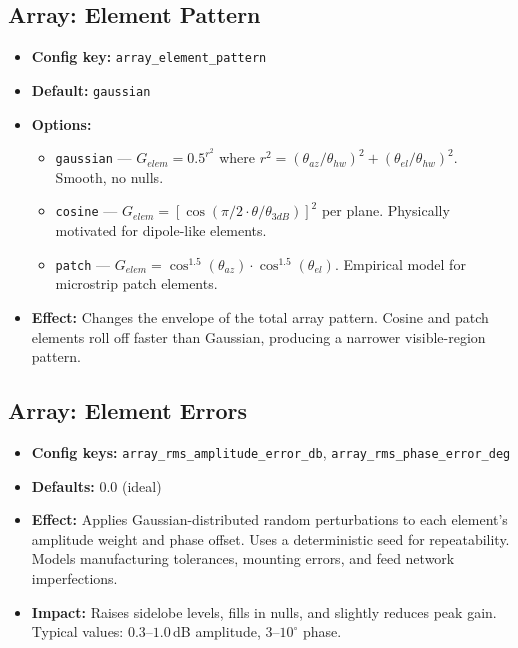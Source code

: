\documentclass[11pt,a4paper]{article}
\begin{document}
\subsection{Array: Element Pattern}
\begin{itemize}
    \item \textbf{Config key:} \texttt{array\_element\_pattern}
    \item \textbf{Default:} \texttt{gaussian}
    \item \textbf{Options:}
    \begin{itemize}
        \item \texttt{gaussian} --- $G_{elem} = 0.5^{r^2}$ where $r^2 = (\theta_{az}/\theta_{hw})^2 + (\theta_{el}/\theta_{hw})^2$. Smooth, no nulls.
        \item \texttt{cosine} --- $G_{elem} = [\cos(\pi/2 \cdot \theta/\theta_{3dB})]^2$ per plane. Physically motivated for dipole-like elements.
        \item \texttt{patch} --- $G_{elem} = \cos^{1.5}(\theta_{az}) \cdot \cos^{1.5}(\theta_{el})$. Empirical model for microstrip patch elements.
    \end{itemize}
    \item \textbf{Effect:} Changes the envelope of the total array pattern. Cosine and patch elements roll off faster than Gaussian, producing a narrower visible-region pattern.
\end{itemize}

\subsection{Array: Element Errors}
\begin{itemize}
    \item \textbf{Config keys:} \texttt{array\_rms\_amplitude\_error\_db}, \texttt{array\_rms\_phase\_error\_deg}
    \item \textbf{Defaults:} 0.0 (ideal)
    \item \textbf{Effect:} Applies Gaussian-distributed random perturbations to each element's amplitude weight and phase offset. Uses a deterministic seed for repeatability. Models manufacturing tolerances, mounting errors, and feed network imperfections.
    \item \textbf{Impact:} Raises sidelobe levels, fills in nulls, and slightly reduces peak gain. Typical values: $0.3$--$1.0$\,dB amplitude, $3$--$10^\circ$ phase.
\end{itemize}
\end{document}
